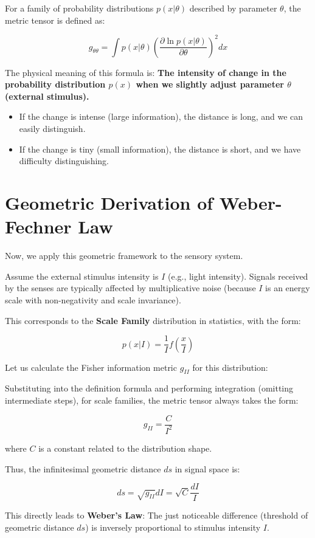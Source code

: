 \documentclass[11pt,a4paper,twoside]{book}
\begin{document}
For a family of probability distributions $p(x|\theta)$ described by parameter $\theta$, the metric tensor is defined as:

$$g_{\theta\theta} = \int p(x|\theta) \left( \frac{\partial \ln p(x|\theta)}{\partial \theta} \right)^2 dx$$

The physical meaning of this formula is: \textbf{The intensity of change in the probability distribution $p(x)$ when we slightly adjust parameter $\theta$ (external stimulus).}

\begin{itemize}
\item If the change is intense (large information), the distance is long, and we can easily distinguish.

\item If the change is tiny (small information), the distance is short, and we have difficulty distinguishing.
\end{itemize}

\section{Geometric Derivation of Weber-Fechner Law}

Now, we apply this geometric framework to the sensory system.

Assume the external stimulus intensity is $I$ (e.g., light intensity). Signals received by the senses are typically affected by multiplicative noise (because $I$ is an energy scale with non-negativity and scale invariance).

This corresponds to the \textbf{Scale Family} distribution in statistics, with the form:

$$p(x|I) = \frac{1}{I} f\left( \frac{x}{I} \right)$$

Let us calculate the Fisher information metric $g_{II}$ for this distribution:

Substituting into the definition formula and performing integration (omitting intermediate steps), for scale families, the metric tensor always takes the form:

$$g_{II} = \frac{C}{I^2}$$

where $C$ is a constant related to the distribution shape.

Thus, the infinitesimal geometric distance $ds$ in signal space is:

$$ds = \sqrt{g_{II}} dI = \sqrt{C} \frac{dI}{I}$$

This directly leads to \textbf{Weber's Law}: The just noticeable difference (threshold of geometric distance $ds$) is inversely proportional to stimulus intensity $I$.
\end{document}
